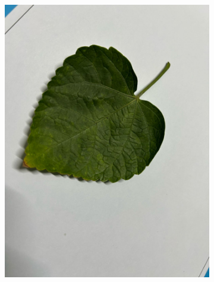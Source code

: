 \documentclass[twocolumn]{article}
\begin{document}
\begin{figure}[H]
\begin{subfigure}[b]{0.30\columnwidth}
        \includegraphics[width=\textwidth]{rosa6}
    \end{subfigure}
    \vspace{0.5em}
    

\end{figure}
\end{document}
